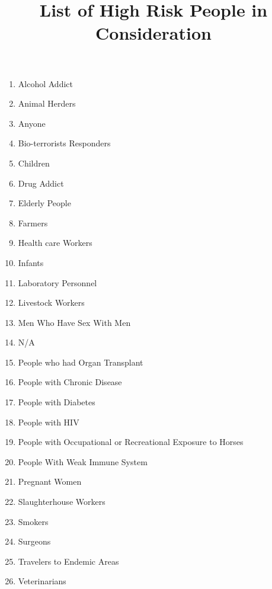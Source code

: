 \documentclass{article}
\title{List of High Risk People in Consideration}
\date{}
\begin{document}
\maketitle
\begin{multicols}{2}
    \begin{enumerate}
      \item Alcohol Addict
      \item Animal Herders
      \item Anyone
      \item Bio-terrorists Responders
      \item Children
      \item Drug Addict
      \item Elderly People
      \item Farmers
      \item Health care Workers
      \item Infants
      \item Laboratory Personnel
      \item Livestock Workers
      \item Men Who Have Sex With Men
      \item N/A
      \item People who had Organ Transplant
      \item People with Chronic Disease
      \item People with Diabetes
      \item People with HIV
      \item People with Occupational or Recreational Exposure to Horses
      \item People With Weak Immune System
      \item Pregnant Women
      \item Slaughterhouse Workers
      \item Smokers
      \item Surgeons
      \item Travelers to Endemic Areas
      \item Veterinarians
    \end{enumerate}
  \end{multicols}
\end{document}
